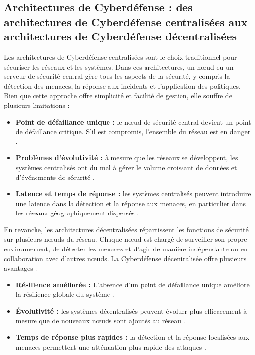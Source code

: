 \subsection{Architectures de Cyberdéfense : des architectures de Cyberdéfense centralisées aux architectures de Cyberdéfense décentralisées}

Les architectures de Cyberdéfense centralisées sont le choix traditionnel pour sécuriser les réseaux et les systèmes. Dans ces architectures, un nœud ou un serveur de sécurité central gère tous les aspects de la sécurité, y compris la détection des menaces, la réponse aux incidents et l'application des politiques. Bien que cette approche offre simplicité et facilité de gestion, elle souffre de plusieurs limitations :

\begin{itemize}
    \item \textbf{Point de défaillance unique :} le nœud de sécurité central devient un point de défaillance critique. S'il est compromis, l'ensemble du réseau est en danger \cite{Mell2011}.
    \item \textbf{Problèmes d'évolutivité :} à mesure que les réseaux se développent, les systèmes centralisés ont du mal à gérer le volume croissant de données et d'événements de sécurité \cite{Xu2019}.
    \item \textbf{Latence et temps de réponse :} les systèmes centralisés peuvent introduire une latence dans la détection et la réponse aux menaces, en particulier dans les réseaux géographiquement dispersés \cite{Benet2014}.
\end{itemize}

En revanche, les architectures décentralisées répartissent les fonctions de sécurité sur plusieurs nœuds du réseau. Chaque nœud est chargé de surveiller son propre environnement, de détecter les menaces et d'agir de manière indépendante ou en collaboration avec d'autres nœuds. La Cyberdéfense décentralisée offre plusieurs avantages :

\begin{itemize}
    \item \textbf{Résilience améliorée :} L'absence d'un point de défaillance unique améliore la résilience globale du système \cite{Zohar2015}.
    \item \textbf{Évolutivité :} les systèmes décentralisés peuvent évoluer plus efficacement à mesure que de nouveaux nœuds sont ajoutés au réseau \cite{Xu2019}.
    \item \textbf{Temps de réponse plus rapides :} la détection et la réponse localisées aux menaces permettent une atténuation plus rapide des attaques \cite{Benet2014}.
\end{itemize}


